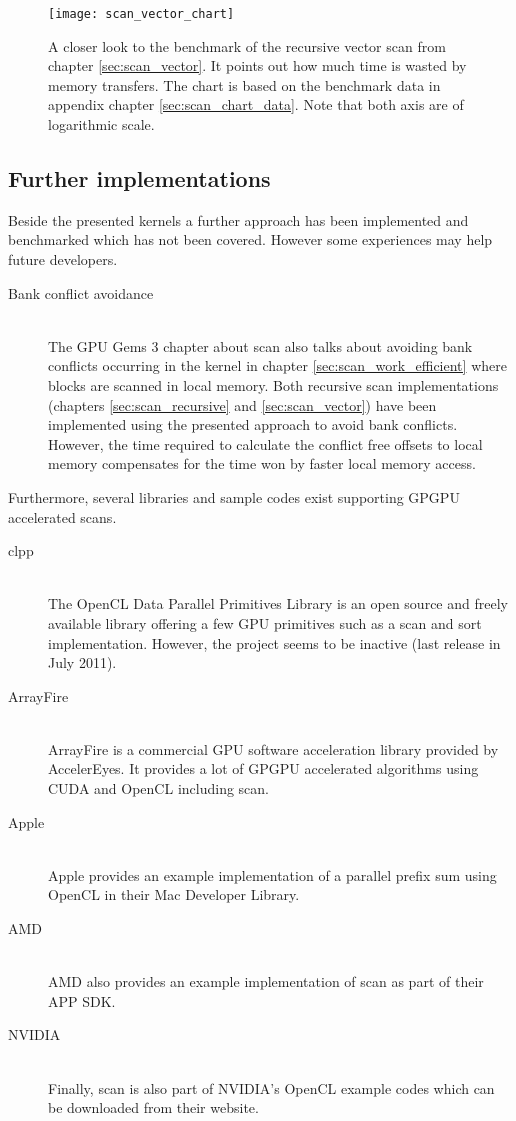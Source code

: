 \begin{figure}
\centering
\texttt{[image: scan\_vector\_chart]}
\caption{A closer look to the benchmark of the recursive vector scan from chapter \ref{sec:scan_vector}. It points out how much time is wasted by memory transfers. The chart is based on the benchmark data in appendix chapter \ref{sec:scan_chart_data}. Note that both axis are of logarithmic scale. }
\label{fig:scan_mem_transfer_chart}
\end{figure}

\subsection{Further implementations}
Beside the presented kernels a further approach has been implemented and benchmarked which has not been covered. However some experiences may help future developers.

\begin{description}
	\item[Bank conflict avoidance] \hfill \\
	The GPU Gems 3 chapter about scan \cite{gpu_gems_3_chapter_39} also talks about avoiding bank conflicts occurring in the kernel in chapter \ref{sec:scan_work_efficient} where blocks are scanned in local memory. Both recursive scan implementations (chapters \ref{sec:scan_recursive} and \ref{sec:scan_vector}) have been implemented using the presented approach to avoid bank conflicts. However, the time required to calculate the conflict free offsets to local memory compensates for the time won by faster local memory access.
\end{description}

Furthermore, several libraries and sample codes exist supporting GPGPU accelerated scans.

\begin{description}
   \item[clpp \cite{clpp}] \hfill \\
   The OpenCL Data Parallel Primitives Library is an open source and freely available library offering a few GPU primitives such as a scan and sort implementation. However, the project seems to be inactive (last release in July 2011).
   \item[ArrayFire \cite{arrayfire}] \hfill \\
   ArrayFire is a commercial GPU software acceleration library provided by AccelerEyes. It provides a lot of GPGPU accelerated algorithms using CUDA and OpenCL including scan.
   \item[Apple \cite{apple_scan}] \hfill \\
   Apple provides an example implementation of a parallel prefix sum using OpenCL in their Mac Developer Library.
   \item[AMD \cite{amd_app_sdk}] \hfill \\
   AMD also provides an example implementation of scan as part of their APP SDK.
   \item[NVIDIA \cite{nvidia_opencl_samples}] \hfill \\
   Finally, scan is also part of NVIDIA's OpenCL example codes which can be downloaded from their website.
\end{description}

